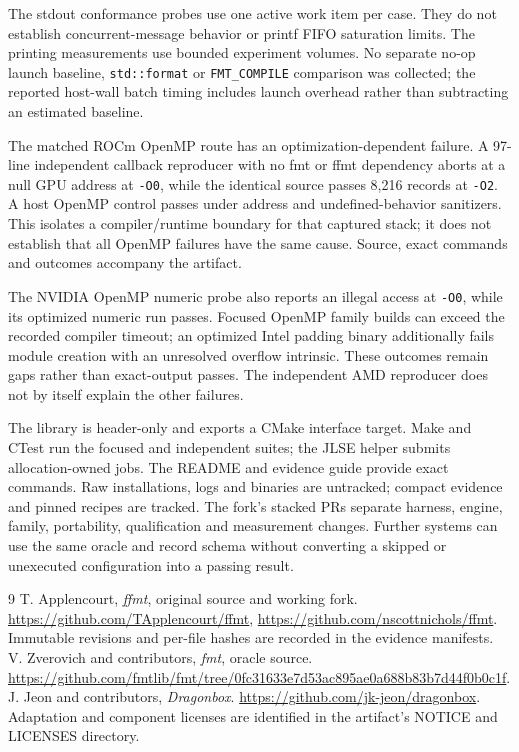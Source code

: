 \documentclass[11pt,letterpaper]{article}
\begin{document}
The stdout conformance probes use one active work item per case. They do not
establish concurrent-message behavior or printf FIFO saturation limits. The
printing measurements use bounded experiment volumes. No separate no-op launch
baseline, \texttt{std::format} or \texttt{FMT\_COMPILE} comparison was collected;
the reported host-wall batch timing includes launch overhead rather than
subtracting an estimated baseline.

The matched ROCm OpenMP route has an optimization-dependent failure. A
97-line independent callback reproducer with no fmt or ffmt dependency aborts
at a null GPU address at \texttt{-O0}, while the identical source passes 8,216
records at \texttt{-O2}. A host OpenMP control passes under address and
undefined-behavior sanitizers. This isolates a compiler/runtime boundary for
that captured stack; it does not establish that all OpenMP failures have the
same cause. Source, exact commands and outcomes accompany the artifact.

The NVIDIA OpenMP numeric probe also reports an illegal access at
\texttt{-O0}, while its optimized numeric run passes. Focused OpenMP family
builds can exceed the recorded compiler timeout; an optimized Intel padding
binary additionally fails module creation with an unresolved overflow
intrinsic. These outcomes remain gaps rather than exact-output passes. The
independent AMD reproducer does not by itself explain the other failures.

The library is header-only and exports a CMake interface target. Make and
CTest run the focused and independent suites; the JLSE helper submits
allocation-owned jobs. The README and evidence guide provide exact commands.
Raw installations, logs and binaries are untracked; compact evidence and
pinned recipes are tracked. The fork's stacked PRs separate harness,
engine, family, portability, qualification and measurement changes.
Further systems can use the same oracle and record schema without converting
a skipped or unexecuted configuration into a passing result.

\begin{thebibliography}{9}
 T. Applencourt, \emph{ffmt}, original source and working
fork. \url{https://github.com/TApplencourt/ffmt},
\url{https://github.com/nscottnichols/ffmt}. Immutable revisions and per-file
hashes are recorded in the evidence manifests.
 V. Zverovich and contributors, \emph{fmt}, oracle source.
\url{https://github.com/fmtlib/fmt/tree/0fc31633e7d53ac895ae0a688b83b7d44f0b0c1f}.
 J. Jeon and contributors, \emph{Dragonbox}.
\url{https://github.com/jk-jeon/dragonbox}. Adaptation and component licenses
are identified in the artifact's NOTICE and LICENSES directory.
\end{thebibliography}
\end{document}
